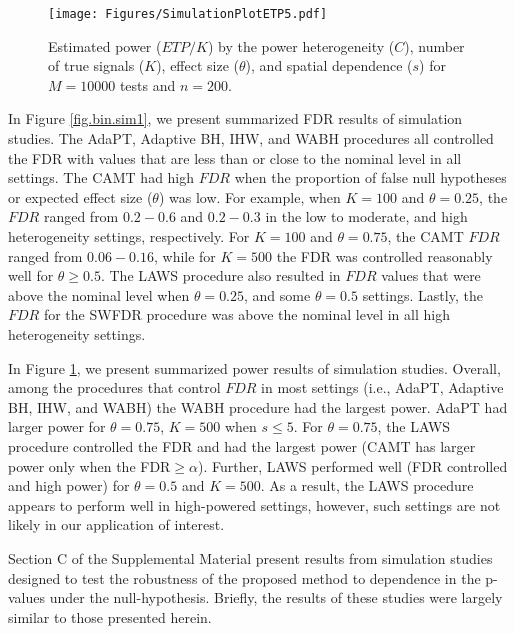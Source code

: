 \documentclass[bimj,fleqn]{w-art}
\theoremstyle{plain}
\theoremstyle{definition}
\begin{document}
\begin{figure}[t]
\begin{center}
\texttt{[image: Figures/SimulationPlotETP5.pdf]} 
\end{center}
\vspace{-.2in}
\caption{Estimated power ($ETP/K$) by the power heterogeneity ($C$), number of true signals ($K$), effect size ($\theta$), and spatial dependence ($s$) for $M=10000$ tests and $n=200$.}\label{fig.bin.sim2}
\end{figure}



In Figure \ref{fig.bin.sim1}, we present summarized FDR results of simulation studies. The AdaPT, Adaptive BH, IHW, and WABH procedures all controlled the FDR with values that are less than or close to the nominal level in all settings. The CAMT had high $FDR$ when the proportion of false null hypotheses or expected effect size ($\theta$) was low. For example, when $K=100$ and $\theta=0.25$, the $FDR$ ranged from $0.2-0.6$ and $0.2-0.3$ in the low to moderate, and high heterogeneity settings, respectively. For $K=100$ and $\theta=0.75$, the CAMT $FDR$ ranged from $0.06-0.16$, while for $K=500$ the FDR was controlled reasonably well for $\theta \geq 0.5$. The LAWS procedure also resulted in $FDR$ values that were above the nominal level when $\theta=0.25$, and some $\theta=0.5$ settings. Lastly, the $FDR$ for the SWFDR procedure was above the nominal level in all high heterogeneity settings. 


In Figure \ref{fig.bin.sim2}, we present summarized power results of simulation studies. Overall, among the procedures that control $FDR$ in most settings (i.e., AdaPT, Adaptive BH, IHW, and WABH) the WABH procedure had the largest power. AdaPT had larger power for $\theta = 0.75$, $K=500$ when $s \leq 5$. For $\theta=0.75$, the LAWS procedure controlled the FDR and had the largest power (CAMT has larger power only when the FDR$\geq \alpha$). Further, LAWS performed well (FDR controlled and high power) for $\theta=0.5$ and $K=500$. As a result, the LAWS procedure appears to perform well in high-powered settings, however, such settings are not likely in our application of interest. 

Section C of the Supplemental Material present results from  simulation studies designed to test the robustness of the proposed method to dependence in the p-values under the null-hypothesis. Briefly, the results of these studies were largely similar to those presented herein. 
\end{document}
